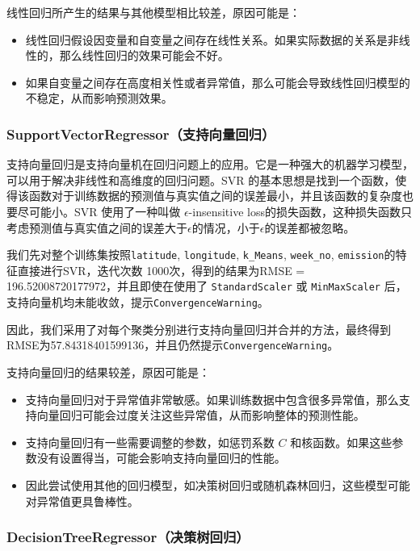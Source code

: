 \documentclass{ctexart}
\begin{document}
\begin{sloppypar}
线性回归所产生的结果与其他模型相比较差，原因可能是：

\begin{itemize}
      \item 线性回归假设因变量和自变量之间存在线性关系。如果实际数据的关系是非线性的，那么线性回归的效果可能会不好。
      \item 如果自变量之间存在高度相关性或者异常值，那么可能会导致线性回归模型的不稳定，从而影响预测效果。
\end{itemize}

\subsubsection{SupportVectorRegressor（支持向量回归）}

支持向量回归是支持向量机在回归问题上的应用。它是一种强大的机器学习模型，可以用于解决非线性和高维度的回归问题。SVR 的基本思想是找到一个函数，使得该函数对于训练数据的预测值与真实值之间的误差最小，并且该函数的复杂度也要尽可能小。SVR 使用了一种叫做 $\epsilon$-insensitive loss的损失函数，这种损失函数只考虑预测值与真实值之间的误差大于$\epsilon$的情况，小于$\epsilon$的误差都被忽略。

我们先对整个训练集按照\texttt{latitude}, \texttt{longitude}, \texttt{k\_Means}, \texttt{week\_no}, \texttt{emission}的特征直接进行SVR，迭代次数 1000次，得到的结果为RMSE = 196.52008720177972，并且即使在使用了 \texttt{StandardScaler} 或 \texttt{MinMaxScaler} 后，支持向量机均未能收敛，提示\texttt{ConvergenceWarning}。

因此，我们采用了对每个聚类分别进行支持向量回归并合并的方法，最终得到RMSE为57.84318401599136，并且仍然提示\texttt{ConvergenceWarning}。

支持向量回归的结果较差，原因可能是：

\begin{itemize}
      \item 支持向量回归对于异常值非常敏感。如果训练数据中包含很多异常值，那么支持向量回归可能会过度关注这些异常值，从而影响整体的预测性能。
      \item 支持向量回归有一些需要调整的参数，如惩罚系数 $C$ 和核函数。如果这些参数没有设置得当，可能会影响支持向量回归的性能。
      \item 因此尝试使用其他的回归模型，如决策树回归或随机森林回归，这些模型可能对异常值更具鲁棒性。
\end{itemize}

\subsubsection{DecisionTreeRegressor（决策树回归）}


\end{sloppypar}
\end{document}
